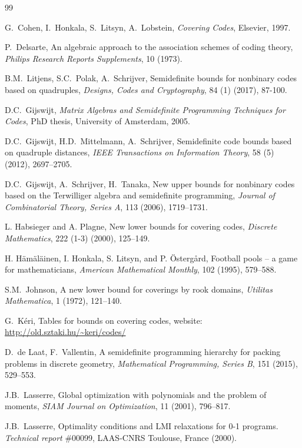 \documentclass[10pt,a4paper]{article}
\theoremstyle{definition}
\begin{document}
\begin{thebibliography}{99} \footnotesize

G.\ Cohen, I.\ Honkala, S.\ Litsyn, A.\ Lobstein, \textsl{Covering Codes}, Elsevier, 1997.


 P.\ Delsarte, An algebraic approach to the association schemes of coding theory,
\textsl{Philips Research Reports Supplements}, 10 (1973).


B.M.\ Litjens, S.C.\ Polak, A.\ Schrijver, Semidefinite bounds for nonbinary codes based on quadruples, \textsl{Designs, Codes and Cryptography}, 84 (1) (2017), 87-100.

 D.C.\ Gijswijt, \textsl{Matrix Algebras and Semidefinite Programming Techniques for Codes},
PhD thesis, University of Amsterdam, 2005.


D.C.\ Gijswijt, H.D.\ Mittelmann, A.\ Schrijver, Semidefinite code bounds based on quadruple distances, \textsl{IEEE Transactions on Information Theory},  58 (5) (2012), 2697--2705.


  D.C.\ Gijswijt, A.\ Schrijver, H.\ Tanaka, 
New upper bounds for nonbinary codes based on the Terwilliger algebra
and semidefinite programming,
{\em Journal of Combinatorial Theory, Series A}, 113 (2006), 1719--1731.

 L. Habsieger and A. Plagne, New lower bounds for covering codes, \textsl{Discrete Mathematics}, 
222 (1-3) (2000), 125--149.


 H. H\"am\"al\"ainen, I. Honkala, S. Litsyn, and P. \"Osterg{\aa}rd, Football pools -- a game for mathematicians, \textsl{American Mathematical Monthly}, 102 (1995), 579--588.

 S.M.\ Johnson, A new lower bound for coverings by rook domains, \textsl{Utilitas Mathematica}, 1 (1972), 121--140.

 G.\ K\'eri, Tables for bounds on covering codes, website: \url{http://old.sztaki.hu/~keri/codes/}

 	D.\ de Laat, F.\ Vallentin, A semidefinite programming hierarchy for packing problems in discrete geometry, \textsl{Mathematical Programming, Series B}, 151 (2015), 529--553.

 J.B.\ Lasserre, Global optimization with polynomials and the problem of moments, \textsl{SIAM Journal on Optimization}, 11 (2001), 796--817.

 J.B.\ Lasserre, Optimality conditions and LMI relaxations for 0-1 programs. \textsl{Technical report} $\#$00099, LAAS-CNRS Toulouse, France (2000).


\end{thebibliography}
\end{document}

